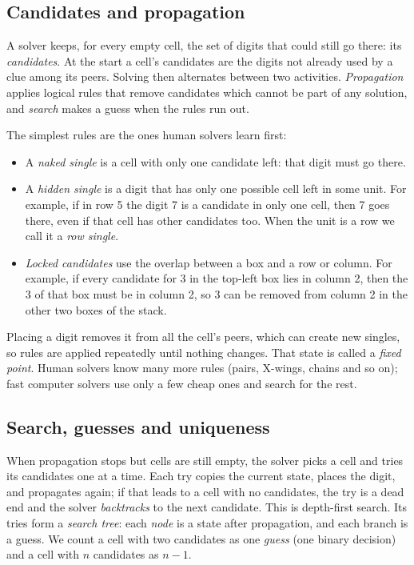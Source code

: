 \documentclass[11pt]{article}
\theoremstyle{definition}
\theoremstyle{plain}
\begin{document}
\subsection{Candidates and propagation}

A solver keeps, for every empty cell, the set of digits that could still go there: its \emph{candidates}. At the start a
cell's candidates are the digits not already used by a clue among its peers. Solving then alternates between two
activities. \emph{Propagation} applies logical rules that remove candidates which cannot be part of any solution, and
\emph{search} makes a guess when the rules run out.

The simplest rules are the ones human solvers learn first:
\begin{itemize}
\item A \emph{naked single} is a cell with only one candidate left: that digit must go there.
\item A \emph{hidden single} is a digit that has only one possible cell left in some unit. For example, if in row 5
  the digit 7 is a candidate in only one cell, then 7 goes there, even if that cell has other candidates too. When the
  unit is a row we call it a \emph{row single}.
\item \emph{Locked candidates} use the overlap between a box and a row or column. For example, if every candidate for 3
  in the top-left box lies in column 2, then the 3 of that box must be in column 2, so 3 can be removed from column 2
  in the other two boxes of the stack.
\end{itemize}
Placing a digit removes it from all the cell's peers, which can create new singles, so rules are applied repeatedly
until nothing changes. That state is called a \emph{fixed point}. Human solvers know many more rules (pairs, X-wings,
chains and so on); fast computer solvers use only a few cheap ones and search for the rest.

\subsection{Search, guesses and uniqueness}

When propagation stops but cells are still empty, the solver picks a cell and tries its candidates one at a time.
Each try copies the current state, places the digit, and propagates again; if that leads to a cell with no candidates,
the try is a dead end and the solver \emph{backtracks} to the next candidate. This is depth-first search. Its tries
form a \emph{search tree}: each \emph{node} is a state after propagation, and each branch is a guess. We count a cell
with two candidates as one \emph{guess} (one binary decision) and a cell with $n$ candidates as $n-1$.
\end{document}

